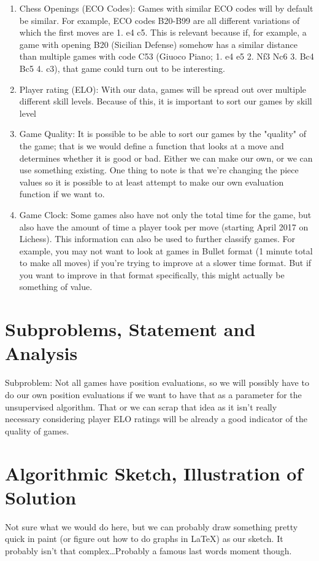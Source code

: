 \documentclass[12pt]{article}
\begin{document}
        \begin{enumerate}
            \item Chess Openings (ECO Codes): Games with similar ECO codes will by default be similar. For example, ECO codes B20-B99 are all different variations of which the first moves are 1. e4 c5. This is relevant because if, for example, a game with opening B20 (Sicilian Defense) somehow has a similar distance than multiple games with code C53 (Giuoco Piano; 1. e4 e5 2. Nf3 Nc6 3. Bc4 Bc5 4. c3), that game could turn out to be interesting. 
            \item Player rating (ELO): With our data, games will be spread out over multiple different skill levels. Because of this, it is important to sort our games by skill level 
            \item Game Quality: It is possible to be able to sort our games by the "quality" of the game; that is we would define a function that looks at a move and determines whether it is good or bad. Either we can make our own, or we can use something existing. One thing to note is that we're changing the piece values so it is possible to at least attempt to make our own evaluation function if we want to.
            \item Game Clock: Some games also have not only the total time for the game, but also have the amount of time a player took per move (starting April 2017 on Lichess). This information can also be used to further classify games. For example, you may not want to look at games in Bullet format (1 minute total to make all moves) if you're trying to improve at a slower time format. But if you want to improve in that format specifically, this might actually be something of value.
        \end{enumerate}

    \section{Subproblems, Statement and Analysis}

    Subproblem: Not all games have position evaluations, so we will possibly have to do our own position evaluations if we want to have that as a parameter for the unsupervised algorithm. That or we can scrap that idea as it isn't really necessary considering player ELO ratings will be already a good indicator of the quality of games. 

    \section{Algorithmic Sketch, Illustration of Solution}

    Not sure what we would do here, but we can probably draw something pretty quick in paint (or figure out how to do graphs in \LaTeX) as our sketch. It probably isn't that complex\dots Probably a famous last words moment though.

    \printbibliography
    
\end{document}
